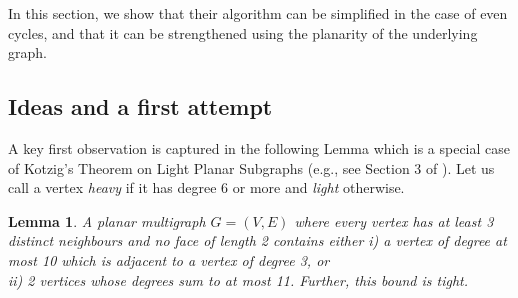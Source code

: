 \documentclass{article}
\newcommand{\0}{\mathbb{0}}
\newcommand{\1}{\mathbb{1}}
\newtheorem{lemma}[theorem]{Lemma}
\begin{document}
In this
section, we show that their algorithm can be simplified in the case of
even cycles, and that it can be strengthened using the planarity of
the underlying graph.

\subsection{Ideas and a first attempt}

A key first observation is captured in the following Lemma which is a
special case of Kotzig's Theorem on Light Planar Subgraphs (e.g., see
Section 3 of \cite{JV13}). 
Let us call a vertex \emph{heavy} if it has degree 6 or more and \emph{light} otherwise.
\begin{lemma}\label{discharge}
  A planar multigraph $ G=(V,E)$ where every vertex has at least 3
  distinct neighbours and no face of length 2 contains either
  i) a vertex of degree at most 10 which is adjacent to a vertex of degree 3, or \\
  ii) 2 vertices whose degrees sum to at most 11. Further, this bound is tight.
\end{lemma}
\end{document}

